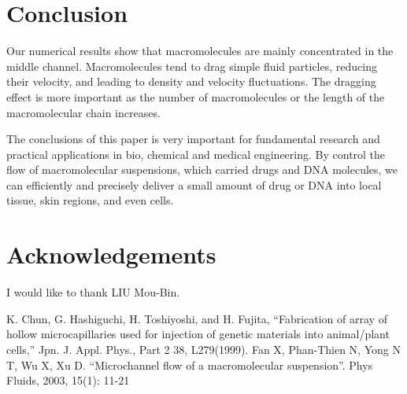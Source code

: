 \documentclass[12pt,a4paper]{article}   %
\begin{document}


\section{Conclusion}                    %
Our numerical results show that macromolecules are mainly concentrated in the middle channel. Macromolecules tend to drag simple fluid particles, reducing their velocity, and leading to density and velocity fluctuations. The dragging effect is more important as the number of macromolecules or the length of the macromolecular chain increases.

The conclusions of this paper is very important for fundamental research and practical applications in bio, chemical and medical engineering. By control the flow of macromolecular suspensions, which carried drugs and DNA molecules, we can efficiently and precisely deliver a small amount of drug or DNA into local tissue, skin regions, and even cells.

\section*{Acknowledgements}             %
I would like to thank LIU Mou-Bin.

\begin{thebibliography}{99}             %
 K. Chun, G. Hashiguchi, H. Toshiyoshi, and H. Fujita, ``Fabrication of array of hollow microcapillaries used for injection of genetic materials into animal/plant cells,'' Jpn. J. Appl. Phys., Part 2 38, L279(1999).
 Fan X, Phan-Thien N, Yong N T, Wu X, Xu D. ``Microchannel flow of a macromolecular suspension''. Phys Fluids, 2003, 15(1): 11-21
\end{thebibliography}


\newpage
\appendix
\appendixpage                           %
\section{}                    %

\end{document}
